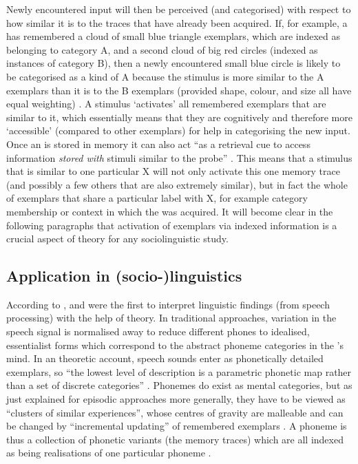Newly encountered input will then be perceived (and categorised) with respect to how similar it is to the traces that have already been acquired.
If, for example, a  has remembered a cloud of small blue triangle exemplars, which are indexed as belonging to category A, and a second cloud of big red circles (indexed as instances of category B), then a newly encountered small blue circle is likely to be categorised as a kind of A because the stimulus is more similar to the A exemplars than it is to the B exemplars (provided shape, colour, and size all have equal weighting) \parencite[cf.][210--212]{medinschaffer1978}.
A stimulus `activates' all remembered exemplars that are similar to it, which essentially means that they are cognitively  and therefore more `accessible' (compared to other exemplars) for help in categorising the new input.
Once an  is stored in memory it can also act ``as a retrieval cue to access information \emph{stored with} stimuli similar to the probe'' \parencite[210, my emphasis]{medinschaffer1978}.
This means that a stimulus that is similar to one particular  X will not only activate this one memory trace (and possibly a few others that are also extremely similar), but in fact the whole  of exemplars that share a particular label with X, for example category membership or context in which the  was acquired.
It will become clear in the following paragraphs that activation of exemplars via indexed information is a crucial aspect of  theory for any sociolinguistic  study.

  \subsection{Application in (socio-)linguistics}
  \label{sec.sal.exemplar.socio}

According to \textcite[cf.][517]{pierrehumbert2006}, \textcite{goldinger1996} and \textcite{johnson1997} were the first to interpret linguistic findings (from speech processing) with the help of  theory.
In traditional approaches, variation in the speech signal is normalised away to reduce different phones to idealised, essentialist forms which correspond to the abstract phoneme categories in the 's mind.
In an  theoretic account, speech sounds enter  as phonetically detailed exemplars, so ``the lowest level of description is a parametric phonetic map rather than a set of discrete categories'' \parencite[519]{pierrehumbert2006}.
Phonemes do exist as mental categories, but as just explained for episodic approaches more generally, they have to be viewed as ``clusters of similar experiences'', whose centres of gravity are malleable and can be changed by ``incremental updating'' of remembered exemplars \parencite[cf.][519]{pierrehumbert2006}.
A phoneme is thus a collection of phonetic variants (the memory traces) which are all indexed as being realisations of one particular phoneme \parencite[cf.][113]{pierrehumbert2002}.

